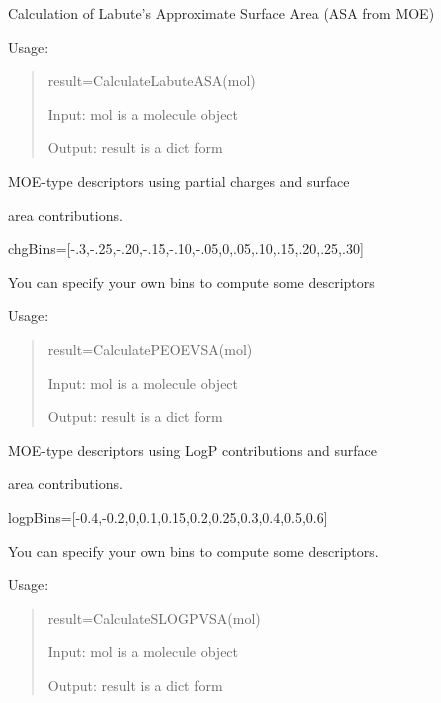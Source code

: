 \documentclass[letterpaper,10pt,english]{sphinxmanual}
\begin{document}

\begin{fulllineitems}
\label{reference/moe:moe.CalculateLabuteASA}
Calculation of Labute's Approximate Surface Area (ASA from MOE)

Usage:
\begin{quote}

result=CalculateLabuteASA(mol)

Input: mol is a molecule object

Output: result is a dict form
\end{quote}

\end{fulllineitems}


\begin{fulllineitems}
\label{reference/moe:moe.CalculatePEOEVSA}
MOE-type descriptors using partial charges and surface

area contributions.

chgBins={[}-.3,-.25,-.20,-.15,-.10,-.05,0,.05,.10,.15,.20,.25,.30{]}

You can specify your own bins to compute some descriptors

Usage:
\begin{quote}

result=CalculatePEOEVSA(mol)

Input: mol is a molecule object

Output: result is a dict form
\end{quote}

\end{fulllineitems}


\begin{fulllineitems}
\label{reference/moe:moe.CalculateSLOGPVSA}
MOE-type descriptors using LogP contributions and surface

area contributions.

logpBins={[}-0.4,-0.2,0,0.1,0.15,0.2,0.25,0.3,0.4,0.5,0.6{]}

You can specify your own bins to compute some descriptors.

Usage:
\begin{quote}

result=CalculateSLOGPVSA(mol)

Input: mol is a molecule object

Output: result is a dict form
\end{quote}

\end{fulllineitems}
\end{document}
